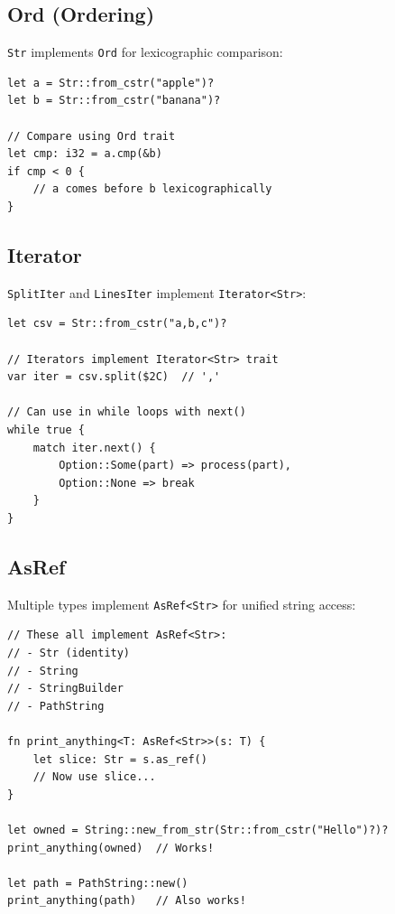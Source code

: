 \subsection{Ord (Ordering)}

\texttt{Str} implements \texttt{Ord} for lexicographic comparison:

\begin{lstlisting}
let a = Str::from_cstr("apple")?
let b = Str::from_cstr("banana")?

// Compare using Ord trait
let cmp: i32 = a.cmp(&b)
if cmp < 0 {
    // a comes before b lexicographically
}
\end{lstlisting}

\subsection{Iterator}

\texttt{SplitIter} and \texttt{LinesIter} implement \texttt{Iterator<Str>}:

\begin{lstlisting}
let csv = Str::from_cstr("a,b,c")?

// Iterators implement Iterator<Str> trait
var iter = csv.split($2C)  // ','

// Can use in while loops with next()
while true {
    match iter.next() {
        Option::Some(part) => process(part),
        Option::None => break
    }
}
\end{lstlisting}

\subsection{AsRef}

Multiple types implement \texttt{AsRef<Str>} for unified string access:

\begin{lstlisting}
// These all implement AsRef<Str>:
// - Str (identity)
// - String
// - StringBuilder
// - PathString

fn print_anything<T: AsRef<Str>>(s: T) {
    let slice: Str = s.as_ref()
    // Now use slice...
}

let owned = String::new_from_str(Str::from_cstr("Hello")?)?
print_anything(owned)  // Works!

let path = PathString::new()
print_anything(path)   // Also works!
\end{lstlisting}

